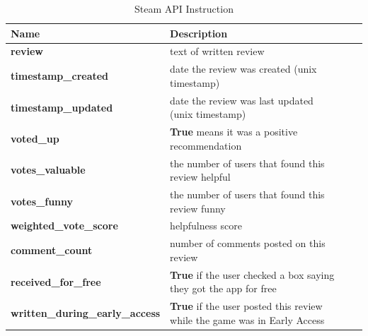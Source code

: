 \documentclass[12pt]{article}
\begin{document}
\begin{table}[H]
    \centering
    \caption{Steam API Instruction}
    \begin{tabular}{lp{}lp{}}
    \toprule
    \textbf{Name}                                                                                          & \textbf{Description}                                                            \\ \midrule
    \textbf{review}                                                                                        & text of written review                                                 \\[+3pt]
    \textbf{timestamp\_created}                                                                            & date the review was created (unix timestamp)                           \\[+3pt]
    \textbf{timestamp\_updated}                                                                            & date the review was last updated (unix timestamp)                      \\[+3pt]
    \textbf{voted\_up}                                                                                     & \textbf{True} means it was a positive recommendation                            \\[+3pt]
    \textbf{votes\_valuable}                                                                               & the number of users that found this review helpful                     \\[+3pt]
    \textbf{votes\_funny}                                                                                  & the number of users that found this review funny                       \\[+3pt]
    \textbf{weighted\_vote\_score}                                                                         & helpfulness score                                                      \\[+3pt]
    \textbf{comment\_count}                                                                                & number of comments posted on this review                               \\[+3pt]
    \textbf{received\_for\_free}                                                                           & \textbf{True} if the user checked a box saying they got the app for free        \\[+3pt]
    \textbf{written\_during\_early\_access}                                                                & \textbf{True} if the user posted this review while the game was in Early Access \\[+3pt]

\end{tabular}
\end{table}
\end{document}
